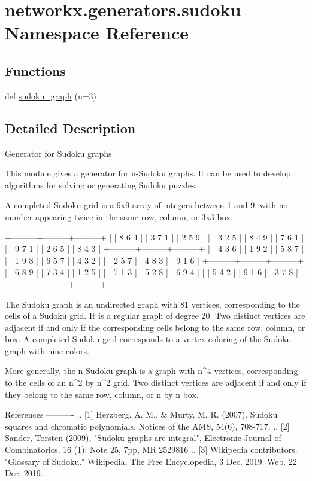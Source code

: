 \hypertarget{namespacenetworkx_1_1generators_1_1sudoku}{}\section{networkx.\+generators.\+sudoku Namespace Reference}
\label{namespacenetworkx_1_1generators_1_1sudoku}
\subsection*{Functions}
\begin{DoxyCompactItemize}
\item 
def \hyperlink{namespacenetworkx_1_1generators_1_1sudoku_a09100a391a388520c07374f6cd612b3d}{sudoku\+\_\+graph} (n=3)
\end{DoxyCompactItemize}


\subsection{Detailed Description}
\begin{DoxyVerb}Generator for Sudoku graphs

This module gives a generator for n-Sudoku graphs. It can be used to develop
algorithms for solving or generating Sudoku puzzles.

A completed Sudoku grid is a 9x9 array of integers between 1 and 9, with no
number appearing twice in the same row, column, or 3x3 box.

+---------+---------+---------+
| | 8 6 4 | | 3 7 1 | | 2 5 9 |
| | 3 2 5 | | 8 4 9 | | 7 6 1 |
| | 9 7 1 | | 2 6 5 | | 8 4 3 |
+---------+---------+---------+
| | 4 3 6 | | 1 9 2 | | 5 8 7 |
| | 1 9 8 | | 6 5 7 | | 4 3 2 |
| | 2 5 7 | | 4 8 3 | | 9 1 6 |
+---------+---------+---------+
| | 6 8 9 | | 7 3 4 | | 1 2 5 |
| | 7 1 3 | | 5 2 8 | | 6 9 4 |
| | 5 4 2 | | 9 1 6 | | 3 7 8 |
+---------+---------+---------+


The Sudoku graph is an undirected graph with 81 vertices, corresponding to
the cells of a Sudoku grid. It is a regular graph of degree 20. Two distinct
vertices are adjacent if and only if the corresponding cells belong to the
same row, column, or box. A completed Sudoku grid corresponds to a vertex
coloring of the Sudoku graph with nine colors.

More generally, the n-Sudoku graph is a graph with n^4 vertices, corresponding
to the cells of an n^2 by n^2 grid. Two distinct vertices are adjacent if and
only if they belong to the same row, column, or n by n box.

References
----------
.. [1] Herzberg, A. M., & Murty, M. R. (2007). Sudoku squares and chromatic
    polynomials. Notices of the AMS, 54(6), 708-717.
.. [2] Sander, Torsten (2009), "Sudoku graphs are integral",
    Electronic Journal of Combinatorics, 16 (1): Note 25, 7pp, MR 2529816
.. [3] Wikipedia contributors. "Glossary of Sudoku." Wikipedia, The Free
    Encyclopedia, 3 Dec. 2019. Web. 22 Dec. 2019.
\end{DoxyVerb}
 

